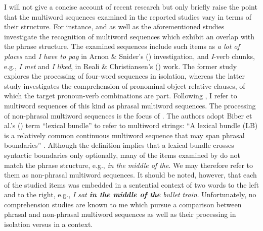 I will not give a concise account of recent research but only briefly raise the point that the multiword sequences examined in the reported studies vary in terms of their structure. For instance, \citet{reali-christiansen} and \citet{arnon-snider} as well as the aforementioned studies investigate the recognition of multiword sequences which exhibit an overlap with the phrase structure. The examined sequences include such items as \textit{a lot of places} and \textit{I have to pay} in Arnon \& Snider's (\citeyear{arnon-snider}) investigation, and \textit{I}-verb chunks, e.g., \textit{I met} and \textit{I liked}, in Reali \& Christiansen's (\citeyear{reali-christiansen}) work. The former study explores the processing of four-word sequences in isolation, whereas the latter study investigates the comprehension of pronominal object relative clauses, of which the target pronoun-verb combinations are part. Following \citet{tremblay-baayen}, I refer to multiword sequences of this kind as phrasal multiword sequences. The processing of non-phrasal multiword sequences is the focus of \citet{tremblay-etal11}. The authors adopt Biber et al.'s (\citeyear{biber-etal-1999}) term “lexical bundle” to refer to multiword strings: ``A lexical bundle (LB) is a relatively common continuous multiword sequence that may span phrasal boundaries'' \citet[][572]{tremblay-etal11}. Although the definition implies that a lexical bundle crosses syntactic boundaries only optionally, many of the items examined by \citeauthor{tremblay-etal11} do not match the phrase structure, e.g., \textit{in the middle of the}. We may therefore refer to them as non-phrasal multiword sequences. It should be noted, however, that each of the studied items was embedded in a sentential context of two words to the left and to the right, e.g., \textit{I sat \textbf{in the middle of the} bullet train}. Unfortunately, no comprehension studies are known to me which pursue a comparison between phrasal and non-phrasal multiword sequences as well as their processing in isolation versus in a context.

